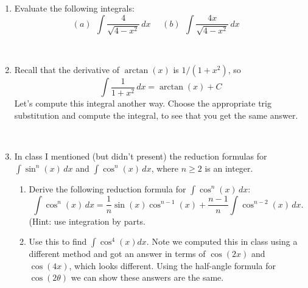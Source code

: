 \documentclass[11pt, oneside]{article}   	%
\title{}
\author{Week 6 discussion problems}
\date{}							%
\begin{document}
\maketitle

\begin{enumerate}


 \item Evaluate the following integrals:
$$(a) \ \ \int \dfrac{4}{\sqrt{4-x^2}} \, dx    \ \ \ \  \ \ (b) \ \ \int \dfrac{4x}{\sqrt{4-x^2}} \, dx \ \ \ \ \  $$
   
\

 
 \item Recall that the derivative of $\arctan(x)$ is $1/(1+x^2)$, so
 $$ \int \dfrac{1}{1+x^2} \, dx= \arctan(x) + C$$
 Let's compute this integral another way. Choose the appropriate trig substitution and compute the integral, to see that you get the same answer.
 
\

 \item  In class I mentioned (but didn't present) the reduction formulas for $\int \sin^n(x) \, dx$ and $\int \cos^n(x) \, dx$, where $n \ge 2$ is an integer. 

\begin{enumerate}

\item Derive the following reduction formula for $\int \cos^n(x) \, dx$:
$$\int \cos^n(x) \, dx= \dfrac{1}{n} \sin(x)\cos^{n-1}(x)+\dfrac{n-1}{n}\int \cos^{n-2}(x) \, dx.$$ 
(Hint: use integration by parts.

\item Use this to find $\int \cos^4(x) dx$. Note we computed this in class using a different method and got an answer in terms of $\cos(2x)$ and $\cos(4x)$, which looks different. Using the half-angle formula for $\cos(2\theta)$ we can show these answers are the same.
 \end{enumerate}

 \end{enumerate}
\end{document}

